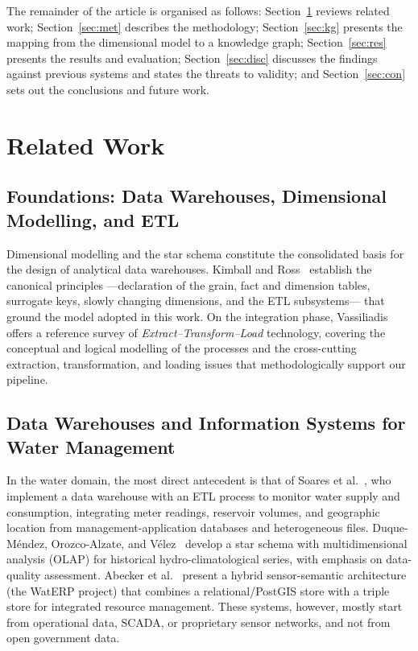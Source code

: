 \documentclass[runningheads]{llncs}
\renewcommand{\_}{\origunderscore\allowbreak}
\newif\ifshowchanges
\newcommand{\new}[1]{\ifshowchanges\textcolor{chg}{#1}\else#1\fi}
\begin{document}
The remainder of the article is organised as follows: Section~\ref{sec:edo}
reviews related work; Section~\ref{sec:met} describes the methodology;
\new{Section~\ref{sec:kg} presents the mapping from the dimensional model to a
knowledge graph;} Section~\ref{sec:res} presents the results and evaluation;
\new{Section~\ref{sec:disc} discusses the findings against previous systems and
states the threats to validity;} and Section~\ref{sec:con} sets out the
conclusions and future work.

\section{Related Work}
\label{sec:edo}

\subsection{Foundations: Data Warehouses, Dimensional Modelling, and ETL}

Dimensional modelling and the star schema constitute the consolidated basis for
the design of analytical data warehouses. Kimball and Ross~\cite{kimball}
establish the canonical principles ---declaration of the grain, fact and
dimension tables, surrogate keys, slowly changing dimensions, and the ETL
subsystems--- that ground the model adopted in this work. On the integration
phase, Vassiliadis~\cite{vassiliadis2009} offers a reference survey of
\emph{Extract--Transform--Load} technology, covering the conceptual and logical
modelling of the processes and the cross-cutting extraction, transformation, and
loading issues that methodologically support our pipeline.

\subsection{Data Warehouses and Information Systems for Water Management}

In the water domain, the most direct antecedent is that of Soares et
al.~\cite{soares2019}, who implement a data warehouse with an ETL process to
monitor water supply and consumption, integrating meter readings, reservoir
volumes, and geographic location from management-application databases and
heterogeneous files. Duque-M\'endez, Orozco-Alzate, and V\'elez~\cite{duque2014}
develop a star schema with multidimensional analysis (OLAP) for historical
hydro-climatological series, with emphasis on data-quality assessment. Abecker
et al.~\cite{abecker2014} present a hybrid sensor-semantic architecture (the
WatERP project) that combines a relational/PostGIS store with a triple store for
integrated resource management. These systems, however, mostly start from
operational data, SCADA, or proprietary sensor networks, and not from open
government data.
\end{document}
